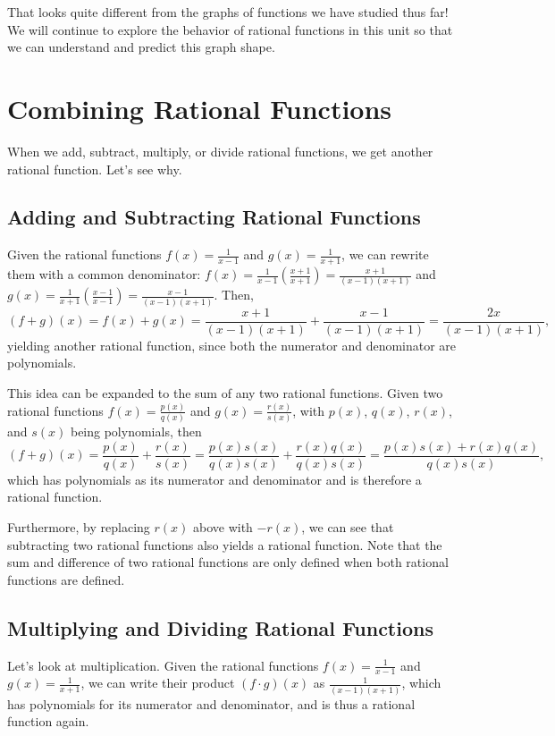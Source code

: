 \documentclass{ximera}
\begin{document}
\begin{example}
\begin{explanation}
That looks quite different from the graphs of functions we have studied thus far!  We will continue to explore the behavior of rational functions in this unit so that we can understand and predict this graph shape.
\end{explanation}
\end{example}

\section{Combining Rational Functions}

When we add, subtract, multiply, or divide rational functions, we get another rational function. Let's see why.

\subsection{Adding and Subtracting Rational Functions}
Given the rational functions $f(x) = \frac{1}{x - 1}$ and $g(x) = \frac{1}{x + 1}$, we can rewrite them with a common denominator: $f(x) = \frac{1}{x - 1} \left(\frac{x + 1}{x + 1}\right) = \frac{x + 1}{(x - 1)(x + 1)}$ and $g(x) = \frac{1}{x +1} \left(\frac{x - 1}{x - 1}\right) = \frac{x - 1}{(x - 1)(x + 1)}$. Then,
$$
(f + g)(x) = f(x) + g(x) = \frac{x + 1}{(x - 1)(x + 1)} + \frac{x - 1}{(x - 1)(x + 1)} = \frac{2x}{(x - 1)(x + 1)},
$$
yielding another rational function, since both the numerator and denominator are polynomials. 

This idea can be expanded to the sum of any two rational functions. Given two rational functions $f(x) = \frac{p(x)}{q(x)}$ and $g(x) = \frac{r(x)}{s(x)}$, with $p(x)$, $q(x)$, $r(x)$, and $s(x)$ being polynomials, then 
$$
(f + g)(x) = \frac{p(x)}{q(x)} + \frac{r(x)}{s(x)} = \frac{p(x)s(x)}{q(x)s(x)} + \frac{r(x)q(x)}{q(x)s(x)} = \frac{p(x)s(x) + r(x)q(x)}{q(x)s(x)}, 
$$
which has polynomials as its numerator and denominator and is therefore a rational function. 

Furthermore, by replacing $r(x)$ above with $-r(x)$, we can see that subtracting two rational functions also yields a rational function. Note that the sum and difference of two rational functions are only defined when both rational functions are defined. 

\subsection{Multiplying and Dividing Rational Functions}
Let's look at multiplication. Given the rational functions $f(x) = \frac{1}{x - 1}$ and $g(x) = \frac{1}{x + 1}$, we can write their product $(f \cdot g)(x)$ as $\frac{1}{(x - 1)(x + 1)}$, which has polynomials for its numerator and denominator, and is thus a rational function again.
\end{document}
